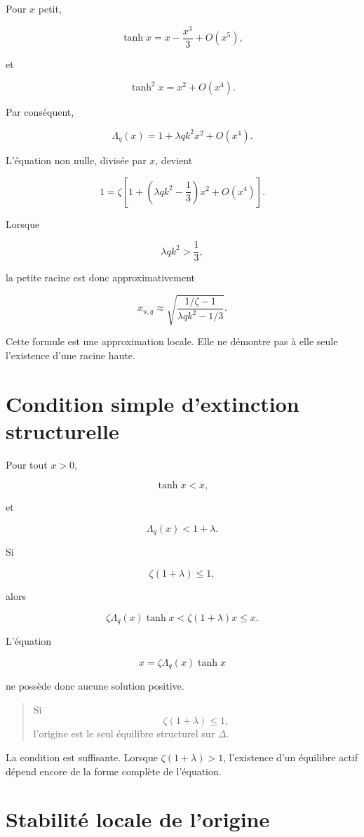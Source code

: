 Pour \(x\) petit,

\[
\tanh x
=
x-\frac{x^3}{3}+O(x^5),
\]

et

\[
\tanh^2x
=
x^2+O(x^4).
\]

Par conséquent,

\[
\Lambda_q(x)
=
1+\lambda qk^2x^2+O(x^4).
\]

L'équation non nulle, divisée par \(x\), devient

\[
1
=
\zeta
\left[
1+
\left(
\lambda qk^2-\frac13
\right)x^2
+
O(x^4)
\right].
\]

Lorsque

\[
\lambda qk^2>\frac13,
\]

la petite racine est donc approximativement

\[
\boxed{
x_{u,q}
\approx
\sqrt{
\frac{1/\zeta-1}
{\lambda qk^2-1/3}
}.
}
\]

Cette formule est une approximation locale. Elle ne démontre pas à
elle seule l'existence d'une racine haute.

\section{Condition simple d'extinction structurelle}
\label{annexe-reduction-extinction-structurelle}

Pour tout \(x>0\),

\[
\tanh x<x,
\]

et

\[
\Lambda_q(x)<1+\lambda.
\]

Si

\[
\zeta(1+\lambda)\leq1,
\]

alors

\[
\zeta\Lambda_q(x)\tanh x
<
\zeta(1+\lambda)x
\leq x.
\]

L'équation

\[
x=\zeta\Lambda_q(x)\tanh x
\]

ne possède donc aucune solution positive.

\begin{quote}
Si
\[
\zeta(1+\lambda)\leq1,
\]
l'origine est le seul équilibre structurel sur \(\Delta\).
\end{quote}

La condition est suffisante. Lorsque
\(\zeta(1+\lambda)>1\), l'existence d'un équilibre actif dépend encore
de la forme complète de l'équation.

\section{Stabilité locale de l'origine}
\label{annexe-reduction-stabilite-origine}

